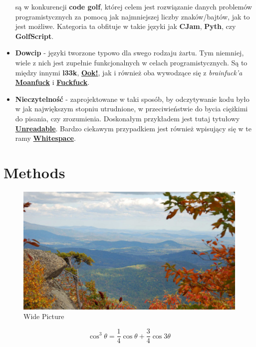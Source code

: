 \documentclass[fleqn,10pt]{SelfArx} %
\begin{document}
\begin{itemize}
	są w konkurencji \textbf{code golf}, której celem jest rozwiązanie danych problemów programistycznych za pomocą jak najmniejszej liczby znaków/bajtów, jak to jest możliwe.
	Kategoria ta obfituje w takie języki jak \textbf{CJam}, \textbf{Pyth}, czy \textbf{GolfScript}.
	\item \textbf{Dowcip} - języki tworzone typowo dla swego rodzaju żartu. Tym niemniej, wiele z nich jest zupełnie funkcjonalnych w celach programistycznych.
	Są to między innymi \textbf{l33k}, \underline{\textbf{Ook!}}, jak i również oba wywodzące się z \textit{brainfuck'a} \underline{\textbf{Moanfuck}} i \underline{\textbf{Fuckfuck}}.
	\item \textbf{Nieczytelność} - zaprojektowane w taki sposób, by odczytywanie kodu było w jak największym stopniu utrudnione, w przeciwieństwie do bycia ciężkimi do pisania, czy zrozumienia.
	Doskonałym przykładem jest tutaj tytułowy \underline{\textbf{Unreadable}}. Bardzo ciekawym przypadkiem jest również wpisujący się w te ramy \underline{\textbf{Whitespace}}.
\end{itemize}


\section{Methods}

\begin{figure}[ht]\centering %
	\includegraphics[width=\linewidth]{view}
	\caption{Wide Picture}
	\label{fig:view}
\end{figure}

\lipsum[4] %

\begin{equation}
	\cos^3 \theta =\frac{1}{4}\cos\theta+\frac{3}{4}\cos 3\theta
	\label{eq:refname2}
\end{equation}
\end{document}
